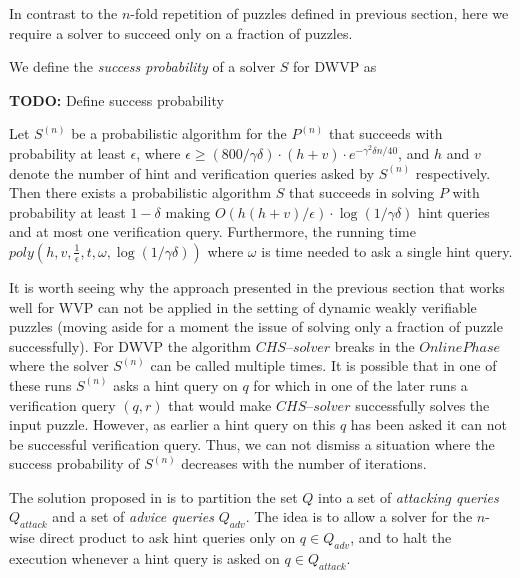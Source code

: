 In contrast to the $n$-fold repetition of puzzles defined in previous section, here we
require a solver to succeed only on a fraction of puzzles.

We define the \textit{success probability} of a solver $S$ for DWVP as
\begin{todo}
  \textbf{TODO:} Define success probability
\end{todo}

\begin{theorem}
Let $S^{(n)}$ be a probabilistic algorithm for the $P^{(n)}$ that succeeds with
probability at least $\epsilon$, where $\epsilon \geq (800/\gamma\delta) \cdot (h+v) \cdot e^{-\gamma^2\delta n/40}$, and $h$ and $v$
denote the number of hint and verification queries asked by $S^{(n)}$ respectively.
Then there exists a probabilistic algorithm $S$ that succeeds in solving $P$ with probability at least
$1-\delta$ making $O(h(h+v)/\epsilon) \cdot \log(1/\gamma\delta)$ hint queries and at most one verification query.
Furthermore, the running time $\mathit{poly}(h,v,\frac{1}{\epsilon}, t, \omega, \log(1/\gamma\delta))$ where
$\omega$ is time needed to ask a single hint query.
\end{theorem}

It is worth seeing why the approach presented in the previous section that works well for WVP
can not be applied in the setting of dynamic weakly verifiable puzzles
(moving aside for a moment the issue of solving only a fraction of puzzle successfully).
For DWVP the algorithm $\mathit{CHS\text{--}solver}$ breaks in the $\mathit{OnlinePhase}$ where
the solver $S^{(n)}$ can be called multiple times.
It is possible that in one of these runs $S^{(n)}$ asks a hint query on $q$
for which in one of the later runs a verification query $(q,r)$
that would make $\mathit{CHS\text{--}solver}$ successfully solves the input puzzle.
However, as earlier a hint query on this $q$ has been asked it can not be successful verification query.
Thus, we can not dismiss a situation where the success probability of $S^{(n)}$ decreases with the number of iterations.

The solution proposed in \cite{Dodis:2009:SAI:1530441.1530450} is to partition the set $Q$ into a set of \textit{attacking queries} $Q_{\mathit{attack}}$
and a set of \textit{advice queries} $Q_{\mathit{adv}}$. The idea is to allow a solver for the $n$-wise direct product to ask hint
queries only on $q \in Q_{\mathit{adv}}$, and to halt the execution whenever a hint query is asked on $q \in Q_{\mathit{attack}}$.

